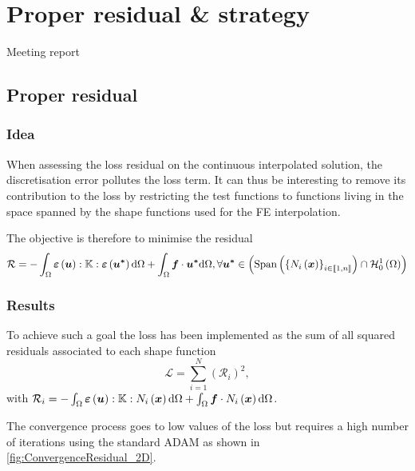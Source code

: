  \chapter[The 23$^{\text{d}}$ of May 2024 - Proper residual \& strategy]{Proper residual \& strategy}

\begin{chapabstract}
	Meeting report
\end{chapabstract}


\minitoc

\section{Proper residual}
\subsection{Idea}
When assessing the loss residual on the continuous interpolated solution, the discretisation error pollutes the loss term. It can thus be interesting to remove its contribution to the loss by restricting the test functions to functions living in the space spanned by the shape functions used for the FE interpolation.

The objective is therefore to minimise the residual
\begin{equation}
	\mathcal{R} = - \int_{\Omega} \mathcal{\boldsymbol{\varepsilon}}\left(\boldsymbol{u}\right):\mathbb{K}:\mathcal{\boldsymbol{\varepsilon}}\left(\boldsymbol{u^*}\right) \mathrm{d} \Omega + \int_{\Omega} \boldsymbol{f}\cdot \boldsymbol{u^*}\mathrm{d} \Omega, \forall \boldsymbol{u^*} \in \left( \text{Span}\left(\left\{N_i\left(\boldsymbol{x}\right)\right\}_{i\in \llbracket 1,n \rrbracket}\right) \cap \mathcal{H}_0^1\left(\Omega\right)\right)
\end{equation}

\subsection{Results}

To achieve such a goal the loss has been implemented as the sum of all squared residuals associated to each shape function
\begin{equation}
	\mathcal{L} = \sum_{i = 1}^{N}  \left( \mathcal{R}_i \right)^2, 
\end{equation}
with $\mathcal{R}_i =  - \int_{\Omega} \mathcal{\boldsymbol{\varepsilon}}\left(\boldsymbol{u}\right):\mathbb{K}: N_i\left(\boldsymbol{x}\right) \mathrm{d} \Omega + \int_{\Omega} \boldsymbol{f}\cdot N_i\left(\boldsymbol{x}\right)\mathrm{d} \Omega$.

The convergence process goes to low values of the loss but requires a high number of iterations using the standard ADAM as shown in \cref{fig:ConvergenceResidual_2D}.

